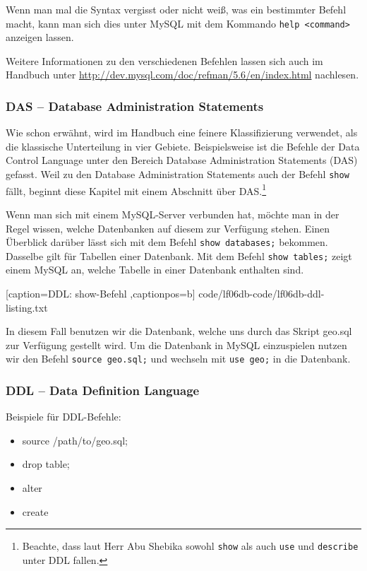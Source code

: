 Wenn man mal die Syntax vergisst oder nicht weiß, was ein bestimmter Befehl macht, kann man sich dies unter MySQL mit dem Kommando \texttt{help <command>} anzeigen lassen.

Weitere Informationen zu den verschiedenen Befehlen lassen sich auch im Handbuch unter \url{http://dev.mysql.com/doc/refman/5.6/en/index.html} nachlesen.

\subsubsection{DAS -- Database Administration Statements}

Wie schon erwähnt, wird im Handbuch eine feinere Klassifizierung verwendet, als die klassische Unterteilung in vier Gebiete. Beispielsweise ist die Befehle der Data Control Language unter den Bereich Database Administration Statements (DAS) gefasst. Weil zu den Database Administration Statements auch der Befehl \texttt{show} fällt, beginnt diese Kapitel mit einem Abschnitt über DAS.\footnote{Beachte, dass laut Herr Abu Shebika sowohl \texttt{show} als auch \texttt{use} und \texttt{describe} unter DDL fallen.}

Wenn man sich mit einem MySQL-Server verbunden hat, möchte man in der Regel wissen, welche Datenbanken auf diesem zur Verfügung stehen. Einen Überblick darüber lässt sich mit dem Befehl \texttt{show databases;} bekommen. Dasselbe gilt für Tabellen einer Datenbank. Mit dem Befehl \texttt{show tables;} zeigt einem MySQL an, welche Tabelle in einer Datenbank enthalten sind.


	[caption={DDL: show-Befehl}
	\label{lst:ddl-show},captionpos=b]
	{code/lf06db-code/lf06db-ddl-listing.txt}

In diesem Fall benutzen wir die Datenbank, welche uns durch das Skript geo.sql zur Verfügung gestellt wird. Um die Datenbank in MySQL einzuspielen nutzen wir den Befehl \texttt{source geo.sql;} und wechseln mit \texttt{use geo;} in die Datenbank.

\subsubsection{DDL -- Data Definition Language}
Beispiele für DDL-Befehle:

	\begin{itemize}
		\item source /path/to/geo.sql;
		\item drop table;
		\item alter
		\item create
	\end{itemize}

